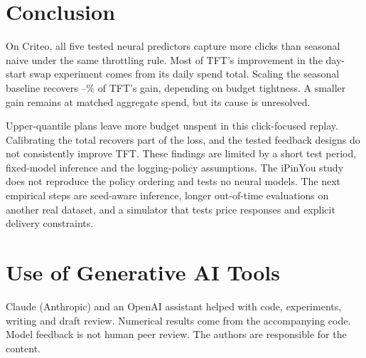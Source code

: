 \documentclass[sigconf,nonacm]{acmart}
\begin{document}
\section{Conclusion}

On Criteo, all five tested neural predictors capture more clicks than seasonal
naive under the same throttling rule. Most of TFT's improvement in the
day-start swap experiment comes from its daily spend total. Scaling the
seasonal baseline recovers --\%
of TFT's gain, depending on budget tightness. A smaller gain remains at
matched aggregate spend, but its cause is unresolved.

Upper-quantile plans leave more budget unspent in this click-focused replay.
Calibrating the total recovers part of the loss, and the tested feedback
designs do not consistently improve TFT. These findings are limited by a
short test period, fixed-model inference and the logging-policy assumptions.
The iPinYou study does not reproduce the policy ordering and tests no neural
models. The next empirical steps are seed-aware inference, longer
out-of-time evaluations on another real dataset, and a simulator that tests
price responses and explicit delivery constraints.

\section*{Use of Generative AI Tools}
Claude (Anthropic) and an OpenAI assistant helped with code, experiments,
writing and draft review. Numerical results come from the accompanying code.
Model feedback is not human peer review. The authors are responsible for the
content.



\end{document}

